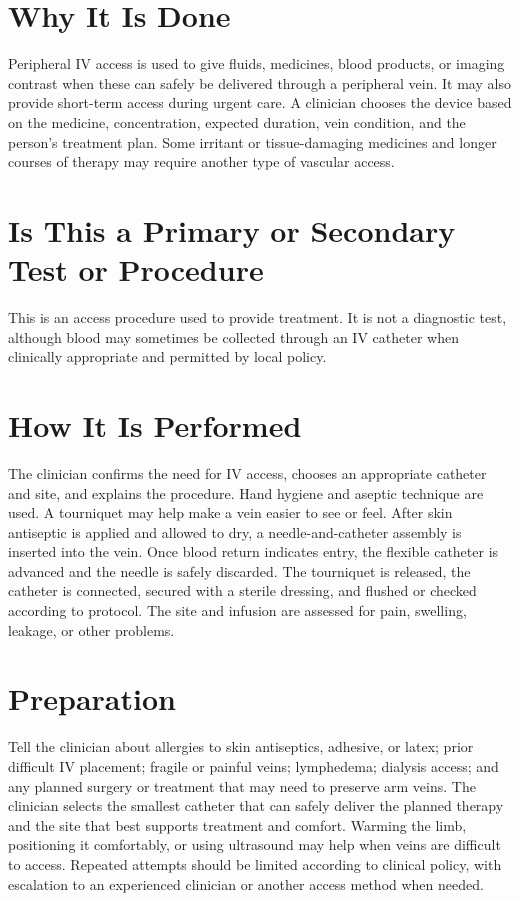 \section*{Why It Is Done}
Peripheral IV access is used to give fluids, medicines, blood products, or imaging contrast when these can safely be delivered through a peripheral vein. It may also provide short-term access during urgent care. A clinician chooses the device based on the medicine, concentration, expected duration, vein condition, and the person's treatment plan. Some irritant or tissue-damaging medicines and longer courses of therapy may require another type of vascular access.

\section*{Is This a Primary or Secondary Test or Procedure}
This is an access procedure used to provide treatment. It is not a diagnostic test, although blood may sometimes be collected through an IV catheter when clinically appropriate and permitted by local policy.

\section*{How It Is Performed}
The clinician confirms the need for IV access, chooses an appropriate catheter and site, and explains the procedure. Hand hygiene and aseptic technique are used. A tourniquet may help make a vein easier to see or feel. After skin antiseptic is applied and allowed to dry, a needle-and-catheter assembly is inserted into the vein. Once blood return indicates entry, the flexible catheter is advanced and the needle is safely discarded. The tourniquet is released, the catheter is connected, secured with a sterile dressing, and flushed or checked according to protocol. The site and infusion are assessed for pain, swelling, leakage, or other problems.

\section*{Preparation}
Tell the clinician about allergies to skin antiseptics, adhesive, or latex; prior difficult IV placement; fragile or painful veins; lymphedema; dialysis access; and any planned surgery or treatment that may need to preserve arm veins. The clinician selects the smallest catheter that can safely deliver the planned therapy and the site that best supports treatment and comfort. Warming the limb, positioning it comfortably, or using ultrasound may help when veins are difficult to access. Repeated attempts should be limited according to clinical policy, with escalation to an experienced clinician or another access method when needed.

